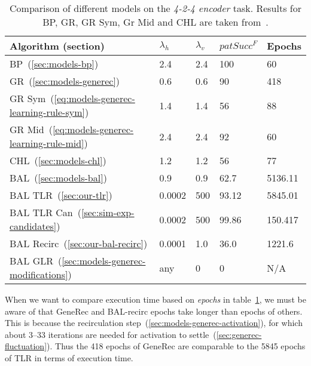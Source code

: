 \begin{table}[H] 
  \centering
    \begin{tabular}{|l|l|l|l|l|}
    \hline
    Algorithm (section)&$\lambda_h$&$\lambda_v$&$patSucc^F$ &Epochs\\ %
    \hline
    BP~(\ref{sec:models-bp}) &2.4 &2.4 &100&60\\ %
    \hline
    GR~(\ref{sec:models-generec}) &0.6 &0.6 &90&418\\ %
    \hline
    GR Sym~(\ref{eq:models-generec-learning-rule-sym}) &1.4 &1.4 &56&88\\ %
    \hline
    GR Mid~(\ref{eq:models-generec-learning-rule-mid}) &2.4 &2.4 &92&60\\ %
    \hline
    CHL~(\ref{sec:models-chl}) &1.2 &1.2 &56&77\\ %
    \hline
    BAL~(\ref{sec:models-bal})&0.9 &0.9 &62.7& 5136.11\\ %
    \hline
    BAL TLR~(\ref{sec:our-tlr})&0.0002  & 500&93.12&5845.01\\ %
    \hline
    BAL TLR Can~(\ref{sec:sim-exp-candidates})&0.0002&500&99.86&150.417\\ %
    \hline
    BAL Recirc~(\ref{sec:our-bal-recirc})&0.0001&1.0&36.0&1221.6\\ %
    \hline
    BAL GLR~(\ref{sec:models-generec-modifications})& any & 0 & 0 & N/A \\
    \hline 
    \end{tabular}
  \caption{Comparison of different models on the \emph{4-2-4 encoder} task. Results for BP, GR, GR Sym, Gr Mid and CHL are taken from~\citet{o1996bio}.} 
  \label{tab:results-cmp-auto4}
\end{table}

When we want to compare execution time based on \emph{epochs} in table~\ref{tab:results-cmp-auto4}, we must be aware of that GeneRec and BAL-recirc epochs take longer than epochs of others. This is because the recirculation step~(\ref{sec:models-generec-activation}), for which about 3--33 iterations are needed for activation to settle~(\ref{sec:generec-fluctuation}). Thus the 418 epochs of GeneRec are comparable to the 5845 epochs of TLR in terms of execution time. 
